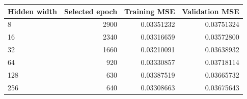 \begin{center}\small
\begin{tabular}{lrrr}
\toprule
Hidden width & Selected epoch & Training MSE & Validation MSE \\
\midrule
8 & 2900 & 0.03351232 & 0.03751324 \\
16 & 2340 & 0.03316659 & 0.03572800 \\
32 & 1660 & 0.03210091 & 0.03638932 \\
64 & 920 & 0.03330857 & 0.03718114 \\
128 & 630 & 0.03387519 & 0.03665732 \\
256 & 640 & 0.03308663 & 0.03675643 \\
\bottomrule
\end{tabular}\end{center}
